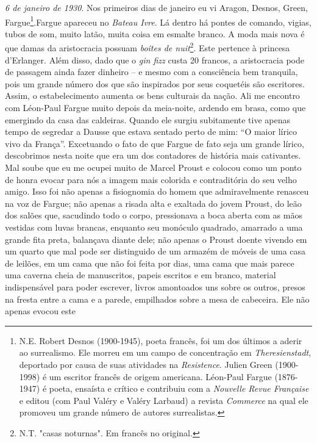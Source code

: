 \emph{6 de janeiro de 1930}. Nos primeiros dias de janeiro eu vi Aragon,
Desnos, Green, Fargue\footnote{N.E. Robert Desnos (1900-1945), poeta
  francês, foi um dos últimos a aderir ao surrealismo. Ele morreu em um
  campo de concentração em \emph{Theresienstadt}, deportado por causa de
  suas atividades na \emph{Resistence}. Julien Green (1900-1998) é um
  escritor francês de origem americana. Léon-Paul Fargue (1876-1947) é
  poeta, ensaísta e crítico e contribuiu com a \emph{Nouvelle Revue
  Française} e editou (com Paul Valéry e Valéry Larbaud) a revista
  \emph{Commerce} na qual ele promoveu um grande número de autores
  surrealistas.}.Fargue apareceu no \emph{Bateau Ivre}. Lá dentro há
pontes de comando, vigias, tubos de som, muito latão, muita coisa em
esmalte branco. A moda mais nova é que damas da aristocracia possuam
\emph{boîtes de nuit}\footnote{N.T. "casas noturnas". Em francês no
  original.}. Este pertence à princesa d'Erlanger. Além disso, dado que
o \emph{gin fizz} custa 20 francos, a aristocracia pode de passagem
ainda fazer dinheiro -- e mesmo com a consciência bem tranquila, pois um
grande número dos que são inspirados por seus coquetéis são escritores.
Assim, o estabelecimento aumenta os bens culturais da nação. Ali me
encontro com Léon-Paul Fargue muito depois da meia-noite, ardendo em
brasa, como que emergindo da casa das caldeiras. Quando ele surgiu
subitamente tive apenas tempo de segredar a Dausse que estava sentado
perto de mim: ``O maior lírico vivo da França''. Excetuando o fato de
que Fargue de fato seja um grande lírico, descobrimos nesta noite que
era um dos contadores de história mais cativantes. Mal soube que eu me
ocupei muito de Marcel Proust e colocou como um ponto de honra evocar
para nós a imagem mais colorida e contraditória do seu velho amigo. Isso
foi não apenas a fisiognomia do homem que admiravelmente renasceu na voz
de Fargue; não apenas a risada alta e exaltada do jovem Proust, do leão
dos salões que, sacudindo todo o corpo, pressionava a boca aberta com as
mãos vestidas com luvas brancas, enquanto seu monóculo quadrado,
amarrado a uma grande fita preta, balançava diante dele; não apenas o
Proust doente vivendo em um quarto que mal pode ser distinguido de um
armazém de móveis de uma casa de leilões, em um cama que não foi feita
por dias, uma cama que mais parece uma caverna cheia de manuscritos,
papeis escritos e em branco, material indispensável para poder escrever,
livros amontoados uns sobre os outros, presos na fresta entre a cama e a
parede, empilhados sobre a mesa de cabeceira. Ele não apenas evocou este
